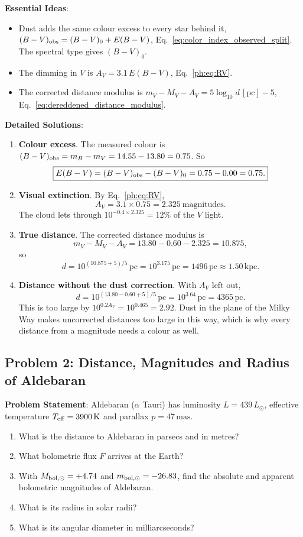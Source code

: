 \textbf{Essential Ideas}:
\begin{itemize}
	\item Dust adds the same colour excess to every star behind it, $(B-V)_{\rm obs}=(B-V)_0+E(B-V)$, Eq.~\eqref{eq:color_index_observed_split}. The spectral type gives $(B-V)_0$.
	\item The dimming in $V$ is $A_V=3.1\,E(B-V)$, Eq.~\eqref{ph:eq:RV}.
	\item The corrected distance modulus is $m_V-M_V-A_V=5\log_{10}d\,[\mathrm{pc}]-5$, Eq.~\eqref{eq:dereddened_distance_modulus}.
\end{itemize}

\textbf{Detailed Solutions}:
\begin{enumerate}[label=(\alph*)]
	\item \textbf{Colour excess}. The measured colour is $(B - V)_{\rm obs} = m_B - m_V = 14.55 - 13.80 = 0.75$. So
	\[
	\boxed{E(B-V) = (B - V)_{\rm obs} - (B - V)_0 = 0.75 - 0.00 = 0.75.}
	\]
	\item \textbf{Visual extinction}. By Eq.~\eqref{ph:eq:RV},
	\[
	\boxed{A_V = 3.1 \times 0.75 = 2.325\ \text{magnitudes}.}
	\]
	The cloud lets through $10^{-0.4\times2.325}=12\%$ of the $V$ light.
	\item \textbf{True distance}. The corrected distance modulus is
	\[
	m_V - M_V - A_V = 13.80 - 0.60 - 2.325 = 10.875 ,
	\]
	so
	\[
	\boxed{d = 10^{(10.875 + 5)/5}\,\mathrm{pc} = 10^{3.175}\,\mathrm{pc} = 1496\,\mathrm{pc} \approx 1.50\,\mathrm{kpc}.}
	\]
	\item \textbf{Distance without the dust correction}. With $A_V$ left out,
	\[
	\boxed{d = 10^{(13.80 - 0.60 + 5)/5}\,\mathrm{pc} = 10^{3.64}\,\mathrm{pc} = 4365\,\mathrm{pc}.}
	\]
	This is too large by $10^{0.2A_V}=10^{0.465}=2.92$. Dust in the plane of the Milky Way makes uncorrected distances too large in this way, which is why every distance from a magnitude needs a colour as well.
\end{enumerate}

\subsection{Problem 2: Distance, Magnitudes and Radius of Aldebaran}
\label{ph:prob:aldebaran}

\textbf{Problem Statement}: Aldebaran ($\alpha$ Tauri) has luminosity $L = 439\,L_\odot$, effective temperature $T_{\rm eff} = 3900\,\mathrm{K}$ and parallax $p = 47\,\mathrm{mas}$.
\begin{enumerate}[label=(\alph*)]
	\item What is the distance to Aldebaran in parsecs and in metres?
	\item What bolometric flux $F$ arrives at the Earth?
	\item With $M_{\rm bol,\odot} = +4.74$ and $m_{\rm bol,\odot}=-26.83$, find the absolute and apparent bolometric magnitudes of Aldebaran.
	\item What is its radius in solar radii?
	\item What is its angular diameter in milliarcseconds?
\end{enumerate}

